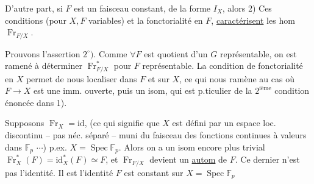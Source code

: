 D'autre part, si $F$ est un faisceau constant, de la forme $I_X$,  alors
2)   Ces conditions (pour $X,F$ variables) et la fonctorialité en $F$, \uline{caractérisent} les hom $\operatorname{Fr}_{F/X}$.

Prouvons l'assertion $2^\circ)$. Comme $\forall F$  est quotient d'un $G$ représentable,  on est ramené à déterminer $\operatorname{Fr}_{F/X}^*$ pour $F$  représentable.
La condition de fonctorialité en $X$   permet de nous localiser dans $F$ et sur $X$, ce qui nous ramène au cas où $F\to X$ est une imm. ouverte, puis un isom, qui est p.ticulier de la $2^{\text{ième}}$ condition énoncée dans 1).

Supposons $\operatorname{Fr}_X=\mathrm{id}$, (ce qui signifie que $X$ est défini par un espace loc.  discontinu -- pas néc. séparé -- muni du faisceau des fonctions continues à valeurs dans $\mathbb F_p$ $\cdots$) p.ex. $X=\operatorname{Spec}\mathbb F_p$. Alors on a un isom encore plus trivial $\operatorname{Fr}_X^*(F)=\mathrm{id}_X^*(F)\simeq F$, et $\operatorname{Fr}_{F/X}$ devient un \uline{autom} de $F$. Ce dernier n'est pas   l'identité. Il est l'identité  $F$ est constant sur $X=\operatorname{Spec}\mathbb F_p$

